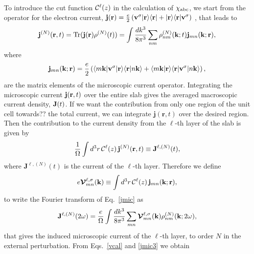\documentclass[floatfix,prb,aps,superscriptaddress,11pt,preprint,letterpaper]{revtex4}
\begin{document}
To introduce the
cut function ${\mathbf{\cal C}}^\ell(z)$ in
the calculation of $\chi_{\mathrm{a}\mathrm{b}\mathrm{c}}$, we start from 
the operator for the electron current,
$\mathbf{j}(\mathbf{r})=\frac{e}{2}\left(\mathbf{v}^\sigma| \mathbf{r} \rangle\langle \mathbf{r} |
+| \mathbf{r} \rangle\langle \mathbf{r} |\mathbf{v}^\sigma\right)${\color{red} , that} leads to
\begin{align}\label{jmic}
\mathbf{j}^{(N)}(\mathbf{r},t)=\mathrm{Tr}(\mathbf{j}(\mathbf{r})\rho^{(N)}(t))
=
\int \frac{dk^3}{8\pi^3}
\sum_{nm}
\rho^{(N)}_{nm}(\mathbf{k};t)\mathbf{j}_{mn}(\mathbf{k};\mathbf{r})
,
\end{align}
where 
\begin{equation}\label{jmic3}
\mathbf{j}_{mn}(\mathbf{k};\mathbf{r})=
\frac{e}{2}
\left(
\langle m\mathbf{k} |\mathbf{v}^\sigma| \mathbf{r} \rangle\langle {\mathbf{r}} | {n\mathbf{k}} \rangle
+
\langle {m\mathbf{k}} | {\mathbf{r}} \rangle\langle \mathbf{r} |\mathbf{v}^\sigma| n\mathbf{k} \rangle
\right),
\end{equation}
are the matrix elements of the microscopic current operator.
Integrating the microscopic current $\mathbf{j}(\mathbf{r},t)$ over
the entire slab gives the averaged macroscopic current density, $\mathbf{J}(t)$. 
If we want the contribution from only one region of the unit cell 
{\color{red} towards??} the total current, we can integrate $\mathbf{j}({\mathbf r},t)$ 
over the desired region. {\color{red} Then the} contribution 
to the current density from the
$\ell$-th layer of the slab is given by
\begin{equation}\label{jsz}
\frac{1}{\Omega}\int d^3r\, {\mathbf{\cal C}}^\ell(z)\, \mathbf{j}^{(N)}(\mathbf{r},t)
 \equiv \mathbf{J}^{\ell,(N)}(t),
\end{equation}
where $\mathbf{J}^{\ell,(N)}(t)$ is the current of the
$\ell$-th layer.
Therefore we define
\begin{equation}\label{vcal}
e{\boldsymbol{\mathcal{V}}}^{\ell,\sigma}_{mn}(\mathbf{k})
\equiv
\int d^3r\, {\mathbf{\cal C}}^\ell(z)\,\mathbf{j}_{mn}({\mathbf{k}};\mathbf{r}),
\end{equation}
to write the Fourier transform of Eq.~\eqref{jmic} as
\begin{equation}\label{jmac2}
\mathbf{J}^{\ell,(N)}(2\omega)=\frac{e}{\Omega}
\int \frac{dk^3}{8\pi^3}
\sum_{mn}
\boldsymbol{\mathcal{\cal V}}^{\ell,\sigma}_{mn}(\mathbf{k}) 
\rho^{(N)}_{nm}(\mathbf{k};2\omega) 
, 
\end{equation}
that gives the induced microscopic current of the $\ell$-th layer, to order $N$ 
in the external perturbation. 
From
Eqs.~\eqref{vcal} and \eqref{jmic3} we obtain
\end{document}
